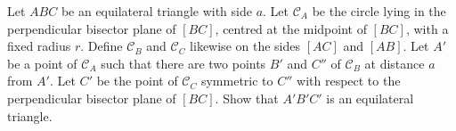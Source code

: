 Let $ABC$ be an equilateral triangle with side $a$. Let $\mathcal{C}_A$ be the circle lying in the perpendicular bisector plane of $[BC]$, centred at the midpoint of $[BC]$, with a fixed radius $r$. Define $\mathcal{C}_B$ and $\mathcal{C}_C$ likewise on the sides $[AC]$ and $[AB]$. Let $A'$ be a point of $\mathcal{C}_A$ such that there are two points $B'$ and $C''$ of $\mathcal{C}_B$ at distance $a$ from $A'$. Let $C'$ be the point of $\mathcal{C}_C$ symmetric to $C''$ with respect to the perpendicular bisector plane of $[BC]$. Show that $A'B'C'$ is an equilateral triangle.
